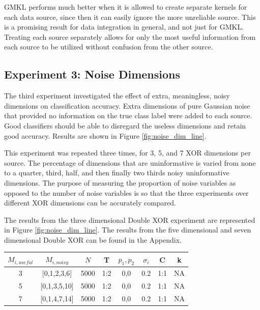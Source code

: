 \documentclass{article}
\begin{document}
GMKL performs much better when it is allowed to create separate kernels for
each data source, since then it can easily ignore the more unreliable source.
This is a promising result for data integration in general, and not just for
GMKL. Treating each source separately allows for only the most useful
information from each source to be utilized without confusion from the other
source.



\subsection*{Experiment 3: Noise Dimensions}

The third experiment investigated the effect of extra, meaningless, noisy
dimensions on classification accuracy. Extra dimensions of pure Gaussian noise
that provided no information on the true class label were added to each source.
Good classifiers should be able to disregard the useless dimensions and retain
good accuracy. Results are shown in Figure \ref{fig:noise_dim_line}.

This experiment was repeated three times, for 3, 5, and 7 XOR dimensions per
source. The percentage of dimensions that are uninformative is varied from none
to a quarter, third, half, and then finally two thirds noisy uninformative
dimensions. The purpose of measuring the proportion of noise variables as
opposed to the number of noise variables is so that the three experiments over
different XOR dimensions can be accurately compared.

The results from the three dimensional Double XOR experiment are represented in
Figure \ref{fig:noise_dim_line}. The results from the five dimensional and
seven dimensional Double XOR can be found in the Appendix.


\begin{minipage}{\textwidth}
\centering
\begin{tabular}{|c|c|c|c|c|c|c|c|}
\hline
$M_{i,useful}$ & $M_{i, noisy}$ & $N$ & T &  $p_1, p_2$ & $\sigma_i$ & C &  k  \\
\hline
3& [0,1,2,3,6] & 5000 &1:2 & 0,0 & 0.2 & 1:1 & NA  \\
\hline
5& [0,1,3,5,10] & 5000 &1:2 & 0,0 & 0.2 & 1:1 & NA  \\
\hline
7& [0,1,4,7,14] & 5000 &1:2 & 0,0 & 0.2 & 1:1 & NA  \\
\hline
\end{tabular}
\label{tab:exp_3_params}
\end{minipage}
\end{document}
